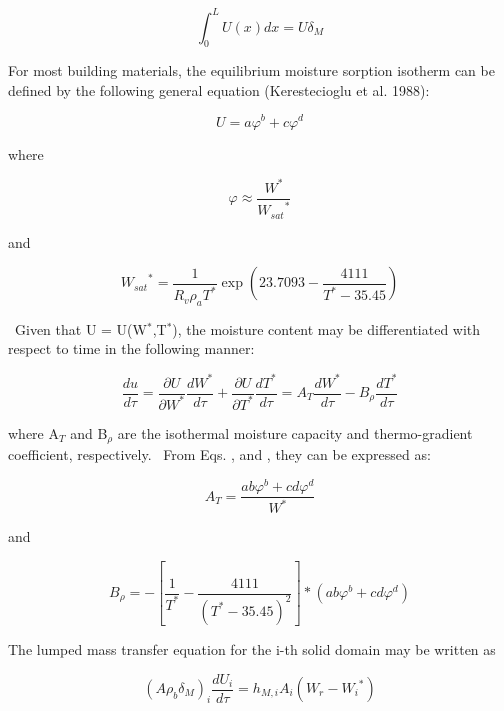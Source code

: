 \begin{equation}
\int_0^L {U(x)dx = U{\delta_M}}
\end{equation}

For most building materials, the equilibrium moisture sorption isotherm can be defined by the following general equation (Kerestecioglu et al. 1988):

\begin{equation}
U = a{\varphi ^b} + c{\varphi ^d}
\end{equation}

where

\begin{equation}
\varphi  \approx \frac{{{W^*}}}{{{W_{sat}}^*}}
\end{equation}

and

\begin{equation}
{W_{sat}}^* = \frac{1}{{{R_v}{\rho_a}{T^*}}}\exp \left( {23.7093 - \frac{{4111}}{{{T^*} - 35.45}}} \right)
\end{equation}

~Given that U = U(W\(^{*}\),T\(^{*}\)), the moisture content may be differentiated with respect to time in the following manner:

\begin{equation}
\frac{{du}}{{d\tau }} = \frac{{\partial U}}{{\partial {W^*}}}\frac{{d{W^*}}}{{d\tau }} + \frac{{\partial U}}{{\partial {T^*}}}\frac{{d{T^*}}}{{d\tau }} = {A_T}\frac{{d{W^*}}}{{d\tau }} - {B_\rho }\frac{{d{T^*}}}{{d\tau }}
\end{equation}

where A\(_{T}\) and B\(_{ρ}\) are the isothermal moisture capacity and thermo-gradient coefficient, respectively.~ From Eqs. , and , they can be expressed as:

\begin{equation}
{A_T} = \frac{{ab{\varphi ^b} + cd{\varphi ^d}}}{{{W^*}}}
\end{equation}

and

\begin{equation}
{B_\rho } =  - \left[ {\frac{1}{{{T^*}}} - \frac{{4111}}{{{{({T^*} - 35.45)}^2}}}} \right]*(ab{\varphi ^b} + cd{\varphi ^d})
\end{equation}

The lumped mass transfer equation for the i-th solid domain may be written as

\begin{equation}
{(A{\rho_b}{\delta_M})_i}\frac{{d{U_i}}}{{d\tau }} = {h_{M,i}}{A_i}({W_r} - {W_i}^*)
\end{equation}

